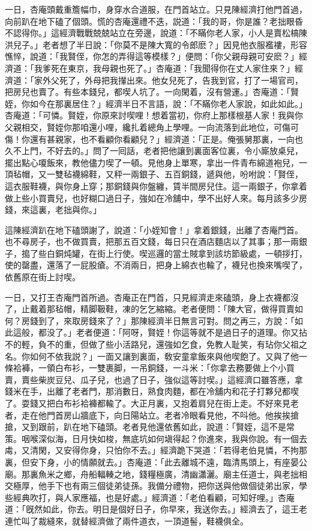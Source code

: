 一日，杏庵頭戴重簷幅巾，身穿水合道服，在門首站立。只見陳經濟打他門首過，向前趴在地下磕了個頭。慌的杏庵還禮不迭，説道：「我的哥，你是誰？老拙眼昏不認得你。」這經濟戰戰兢兢站立在旁邊，說道：「不瞞你老人家，小人是賣松槁陳洪兒子。」老者想了半日說：「你莫不是陳大寬的令郎麽？」因見他衣服襤褸，形容憔悴，說道：「我賢侄，你怎的弄得這等模樣？」便問：「你父親母親可安麽？」經濟道：「我爹死在東京，我母親也死了。」杏庵道：「我聞得你在丈人家住來？」經濟道：「家外父死了，外母把我攆出來。他女兒死了，告我到官，打了一場官司，把房兒也賣了。有些本錢兒，都喫人坑了。一向閑着，沒有營運。」杏庵道：「賢姪，你如今在那裏居住？」經濟半日不言語，說：「不瞞你老人家說，如此如此。」杏庵道：「可憐。賢姪，你原來討喫哩！想着當初，你府上那樣根基人家！我與你父親相交，賢姪你那咱還小哩，纔扎着總角上學哩。一向流落到此地位，可傷可傷！你還有甚親家，也不看顧你看顧兒？」經濟道：「正是。俺張舅那裏，一向也久不上門，不好去的。」問了一囘話，老者把他讓到裏面客位裏，令小廝放桌兒，擺出點心嗄飯來，教他儘力喫了一頓。見他身上單寒，拿出一件青布綿道袍兒，一頂毡帽，又一雙毡襪綿鞋，又秤一兩銀子、五百銅錢，遞與他，吩咐說：「賢侄，這衣服鞋襪，與你身上穿；那銅錢與你盤纏，賃半間房兒住。這一兩銀子，你拿着做上些小買賣兒，也好糊口過日子，強如在冷舖中，學不出好人來。每月該多少房錢，來這裏，老拙與你。」

這陳經濟趴在地下磕頭謝了，說道：「小姪知會！」拿着銀錢，出離了杏庵門首。也不尋房子，也不做買賣，把那五百文錢，每日只在酒店麵店以了其事；那一兩銀子，搗了些白銅炖罐，在街上行使。喫巡邏的當土賊拿到該坊節級處，一頓拶打，使的罄盡，還落了一屁股瘡。不消兩日，把身上綿衣也輸了，襪兒也換來嘴喫了，依舊原在街上討喫。

一日，又打王杏庵門首所過。杏庵正在門首，只見經濟走來磕頭，身上衣襪都沒了，止戴着那毡帽，精脚靸鞋，凍的乞乞縮縮。老者便問：「陳大官，做得買賣如何？房錢到了，來取房錢來了？」那陳經濟半日無言可對。問之再三，方說：「如此這般，都没了。」老者便道：「阿呀，賢姪！你這等就不是過日子的道理。你又拈不的輕，負不的重，但做了些小活路兒，還強如乞食，免教人耻笑，有玷你父祖之名。你如何不依我説？」一面又讓到裏面，敎安童拿飯來與他喫飽了。又與了他一條袷褲，一領白布衫，一雙裹脚，一吊銅錢，一斗米：「你拿去務要做上个小買賣，賣些柴炭豆兒、瓜子兒，也過了日子，強似這等討喫。」這經濟口雖答應，拿錢米在手，出離了老者門，那消數日，熟食肉麵，都在冷舖内和花子打夥兒都喫了。耍錢又把白布衫袷褲都輸了。大正月裏，又抱着肩兒在街上走。不好來見老者，走在他門首房山牆底下，向日陽站立。老者冷眼看見他，不呌他。他挨挨搶搶，又到跟前，趴在地下磕頭。老者見他還依舊如此，說道：「賢姪，這不是常策。咽喉深似海，日月快如梭，無底坑如何塡得起？你進來，我與你說。有一個去䖏，又清閑，又安得你身，只怕你不去。」經濟跪下哭道：「若得老伯見憐，不拘那裏，但安下身，小的情願就去。」杏庵道：「此去離城不遠，臨清馬頭上，有座晏公廟。那裏魚米之鄉，舟船輻輳之地，錢糧極廣，清幽瀟灑。廟主任道士，與老拙相交極厚，他手下也有兩三個徒弟徒孫。我備分禮物，把你送與他做個徒弟出家，學些經典吹打，與人家應福，也是好處。」經濟道：「老伯看顧，可知好哩。」杏庵道：「旣然如此，你去。明日是個好日子，你早來，我送你去。」經濟去了，這王老連忙叫了裁縫來，就替經濟做了兩件道衣，一頂道髻，鞋襪俱全。

